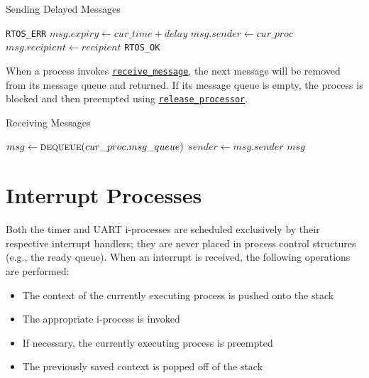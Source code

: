 \documentclass[12pt]{report}
\begin{document}
\begin{algorithm}
\caption{Sending Delayed Messages}
\label{alg:sendingdelayedmessages}
\begin{algorithmic}[1]
        \State \Return \texttt{RTOS_ERR}
    \EndIf
    \State $msg.expiry \leftarrow cur\_time + delay$
    \State $msg.sender \leftarrow cur\_proc$
    \State $msg.recipient \leftarrow recipient$
    \State {}
    \State \Return \texttt{RTOS_OK}
\EndProcedure
\end{algorithmic}
\end{algorithm}

When a process invokes \hyperref[alg:receivingmessages]{\texttt{receive_message}}, the next message will be removed from its message queue and returned. If its message queue is empty, the process is blocked and then preempted using \hyperref[alg:releasingtheprocessor]{\texttt{release_processor}}.\\

\begin{algorithm}
\caption{Receiving Messages}
\label{alg:receivingmessages}
\begin{algorithmic}[1]
        \State {}
        \State {}
    \EndWhile
    \State $msg \leftarrow \Call{dequeue}{cur\_proc.msg\_queue}$
    \State $sender \leftarrow msg.sender$
    \State \Return $msg$
\EndProcedure
\end{algorithmic}
\end{algorithm}

\section{Interrupt Processes}

Both the timer and UART i-processes are scheduled exclusively by their respective interrupt handlers; they are never placed in process control structures (e.g., the ready queue). When an interrupt is received, the following operations are performed:

\begin{itemize}

\item The context of the currently executing process is pushed onto the stack
\item The appropriate i-process is invoked
\item If necessary, the currently executing process is preempted
\item The previously saved context is popped off of the stack

\end{itemize}
\end{document}
